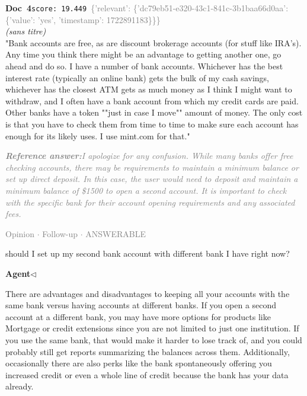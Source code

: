 \documentclass[a4paper,11pt]{article}
\begin{document}
\begin{docenv}
{\footnotesize\textcolor{doccolor}{\textbf{Doc~4}}}\hfill{\tiny\texttt{score:~19.449}}\ {\tiny\textcolor{gray}{\{'relevant': \{'dc79eb51-e320-43c1-841c-3b1baa66d0aa': \{'value': 'yes', 'timestamp': 1722891183\}\}\}}}\\[3pt]
{\small\textit{(sans titre)}}\\[2pt]
\vspace{2pt}
{\footnotesize 
"Bank accounts are free, as are discount brokerage accounts (for stuff like IRA's).  Any time you think there might be an advantage to getting another one, go ahead and do so. I have a number of bank accounts.  Whichever has the best interest rate (typically an online bank) gets the bulk of my cash savings, whichever has the closest ATM gets as much money as I think I might want to withdraw, and I often have a bank account from which my credit cards are paid. Other banks have a token ""just in case I move"" amount of money. The only cost is that you have to check them from time to time to make sure each account has enough for its likely uses.  I use mint.com for that."}
\end{docenv}
\begin{refanswerenv}
{\footnotesize\textit{\textcolor{gray}{\textbf{Reference answer:}\enspace I apologize for any confusion. While many banks offer free checking accounts, there may be requirements to maintain a minimum balance or set up direct deposit. In this case, the user would need to deposit and maintain a minimum balance of \$1500 to open a second account. It is important to check with the specific bank for their account opening requirements and any associated fees.}}}
\end{refanswerenv}
\vspace{0.5em}
\hfill{\tiny\textcolor{gray}{Opinion $\cdot$ Follow-up $\cdot$ ANSWERABLE}}
\begin{userbubble}
should I set up my second bank account with different bank I have right now?
\end{userbubble}
\noindent\hfill{\small\textcolor{agentcolor}{\textbf{Agent\enspace$\triangleleft$}}}
\begin{agentbubble}
There are advantages and disadvantages to keeping all your accounts with the same bank versus having accounts at different banks. If you open a second account at a different bank, you may have more options for products like Mortgage or credit extensions since you are not limited to just one institution. If you use the same bank, that would make it harder to lose track of, and you could probably still get reports summarizing the balances across them. Additionally, occasionally there are also perks like the bank spontaneously offering you increased credit or even a whole line of credit because the bank has your data already.
\end{agentbubble}
\end{document}
